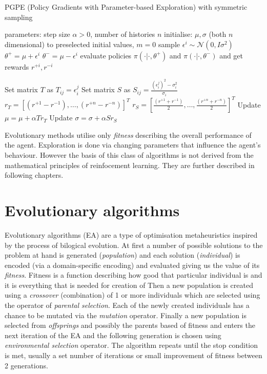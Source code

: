 \begin{algorithm}[h]
    \begin{algorithmic}[1]
    \caption{PGPE (Policy Gradients with Parameter-based Exploration) with symmetric sampling}
    \label{alg:pgpe}
        \State parameters: step size $\alpha>0$, number of histories $n$ 
        \State initialise: $\mu, \sigma$ (both $n$ dimensional) to preselected initial values, $m=0$
        \Repeat
                \State sample $\epsilon^i \sim \mathcal{N}(0,I\sigma^2)$
                \State $\theta^+ = \mu+\epsilon^i$
                \State $\theta^- = \mu-\epsilon^i$
                \State evaluate policies $\pi(\cdot|\cdot,\theta^+)$ and $\pi(\cdot|\cdot, \theta^-)$ and get rewards $r^{+i}, r^{-i}$
                
            \EndFor
            \State Set matrix $T$ as $T_{ij} = \epsilon_i^j$
            \State Set matrix $S$ as $S_{ij} = \frac{(\epsilon^j_i)^2-\sigma_i^2}{\sigma_i}$
            \State $r_T = [(r^{+1}-r^{-1}),\dots,(r^{+n}-r^{-n})]^T$
            \State $r_S = [\frac{(r^{+1}+r^{-1})}{2},\dots,\frac{(r^{+n}+r^{-n})}{2}]^T$
            \State Update $\mu = \mu + \alpha T r_T$
            \State Update $\sigma = \sigma + \alpha S r_S$
    \end{algorithmic}
\end{algorithm}


Evolutionary methods utilise only \emph{fitness} describing the overall performance of the agent. Exploration is done via changing parameters that influence the agent's behaviour. However the basis of this class of algorithms is not derived from the mathematical principles of reinfocement learning. They are further described in following chapters.

\section{Evolutionary algorithms}
\label{sec:ea}
Evolutionary algorithms (EA) are a type of optimisation metaheuristics inspired by the process of bilogical evolution. At first a number of possible solutions to the problem at hand is generated (\emph{population}) and each solution (\emph{individual}) is encoded (via a domain-specific encoding) and evaluated giving us the value of its \emph{fitness}. Fitness is a function describing how good that particular individual is and it is everything that is needed for creation of  Then a new population is created using a \emph{crossover} (combination) of 1 or more individuals which are selected using the operator of \emph{parental selection}. Each of the newly created individuals has a chance to be mutated via the \emph{mutation} operator. Finally a new population is selected from \emph{offsprings} and possibly the parents based of fitness and enters the next iteration of the EA and the following generation is chosen using \emph{environmental selection} operator. The algorithm repeats until the stop condition is met, usually a set number of iterations or small improvement of fitness between 2 generations. 

